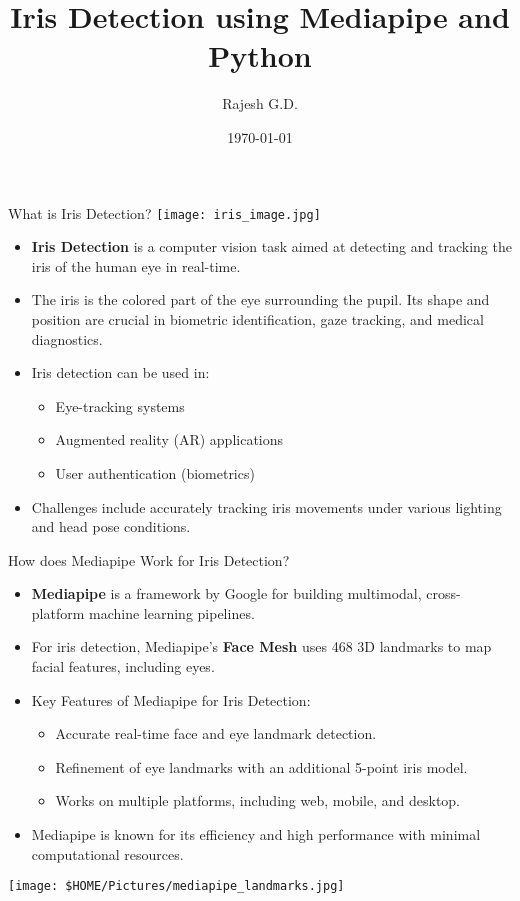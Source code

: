 \documentclass{beamer}
\title{Iris Detection using Mediapipe and Python}
\author{Rajesh G.D.}
\date{\today}
\begin{document}
	
	\begin{frame}
		\titlepage
	\end{frame}
	
	\begin{frame}{What is Iris Detection?}
		\centering
		\texttt{[image: iris\_image.jpg]}
		\begin{itemize}
			\item \textbf{Iris Detection} is a computer vision task aimed at detecting and tracking the iris of the human eye in real-time.
			\item The iris is the colored part of the eye surrounding the pupil. Its shape and position are crucial in biometric identification, gaze tracking, and medical diagnostics.
			\item Iris detection can be used in:
			\begin{itemize}
				\item Eye-tracking systems
				\item Augmented reality (AR) applications
				\item User authentication (biometrics)
			\end{itemize}
			\item Challenges include accurately tracking iris movements under various lighting and head pose conditions.
		\end{itemize}
	\end{frame}
	
	\begin{frame}{How does Mediapipe Work for Iris Detection?}
		\begin{itemize}
			\item \textbf{Mediapipe} is a framework by Google for building multimodal, cross-platform machine learning pipelines.
			\item For iris detection, Mediapipe's \textbf{Face Mesh} uses 468 3D landmarks to map facial features, including eyes.
			\item Key Features of Mediapipe for Iris Detection:
			\begin{itemize}
				\item Accurate real-time face and eye landmark detection.
				\item Refinement of eye landmarks with an additional 5-point iris model.
				\item Works on multiple platforms, including web, mobile, and desktop.
			\end{itemize}
			\item Mediapipe is known for its efficiency and high performance with minimal computational resources.
		\end{itemize}
	\end{frame}
	\begin{frame}
		\texttt{[image: \$HOME/Pictures/mediapipe\_landmarks.jpg]}
	\end{frame}
	
\end{document}
